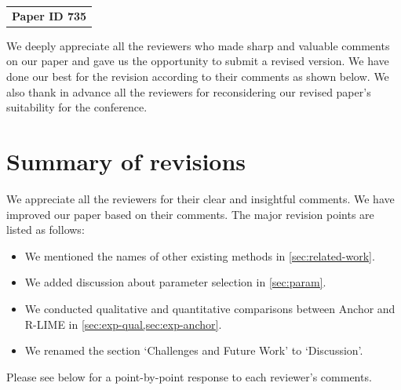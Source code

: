 \documentclass[runningheads]{llncs}
\def\paperID{735} %
\begin{document}
\begin{center}
  \vspace*{-22pt}
  \begin{tabular}[t]{c}{
      \large\bf
      Paper ID \paperID{}
    }
  \end{tabular}
  \par
\end{center}
We deeply appreciate all the reviewers who made sharp and valuable comments
on our paper and gave us the opportunity to submit a revised version.
We have done our best for the revision according to their comments as shown below.
We also thank in advance all the reviewers for reconsidering
our revised paper's suitability for the conference.

\section*{Summary of revisions}
We appreciate all the reviewers for their clear and insightful
comments.
We have improved our paper based on their comments.
The major revision points are listed as follows:
\begin{itemize}
  \item We mentioned the names of other existing methods in \cref{sec:related-work}.
  \item We added discussion about parameter selection in \cref{sec:param}.
  \item We conducted qualitative and quantitative comparisons
        between Anchor and R-LIME in \cref{sec:exp-qual,sec:exp-anchor}.
  \item We renamed the section `Challenges and Future Work' to `Discussion'.
\end{itemize}
Please see below for a point-by-point response to each reviewer's comments.

\newenvironment{mycomment}{
  \vspace{10pt}\hspace{.02\textwidth}\begin{minipage}{.92\textwidth}
    }{\end{minipage}}
\end{document}
